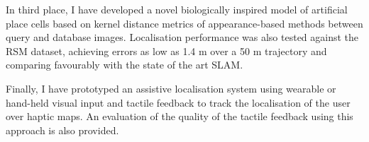 In third place, I have developed a novel biologically inspired model of artificial place cells based on kernel distance metrics of appearance-based methods between query and database images. Localisation performance was also tested against the RSM dataset, achieving errors as low as 1.4 m over a 50 m trajectory and comparing favourably with the state of the art SLAM. 

Finally, I have prototyped an assistive localisation system using wearable or hand-held visual input and tactile feedback to track the localisation of the user over haptic maps. An evaluation of the quality of the tactile feedback using this approach is also provided.


\vfill



\endgroup			

\vfill